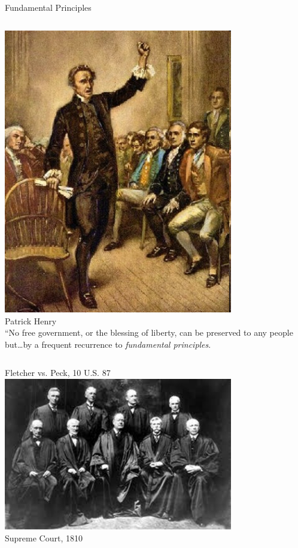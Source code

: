 \documentclass{beamer}
\begin{document}
\begin{frame}{Fundamental Principles}
    \begin{columns}[onlytextwidth]
            \centering
            \includegraphics[width=0.75\textwidth]{img/patrick-henry.png} \\
            Patrick Henry \\

            ``No free government, or the blessing of liberty, can be preserved to any people but\ldots by a frequent recurrence to \emph{fundamental principles}.
    \end{columns}
\end{frame}

\begin{frame}{Fletcher vs. Peck, 10 U.S. 87}
    \centering
    \includegraphics[width=0.75\textwidth]{img/supreme-court-1810.png} \\
    Supreme Court, 1810 \\
\end{frame}
\end{document}
